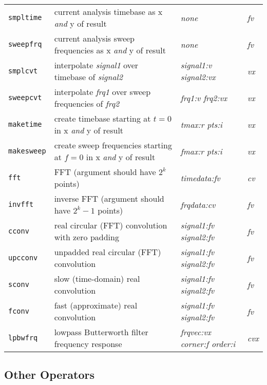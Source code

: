 \begin{tabular}{p{.8in}p{2.5in}p{1.0in}p{.75in}}
{\tt smpltime} & current analysis timebase as x {\em and} y of
result &
  {\it none} & {\it fv} \\
{\tt sweepfrq} & current analysis sweep frequencies as x {\em and}
  y of result & {\it none} & {\it fv} \\
{\tt smplcvt} & interpolate {\em signal1} over timebase of {\em
signal2} &
  {\it signal1:v \newline signal2:vx} & {\it vx} \\
{\tt sweepcvt} & interpolate {\em frq1} over sweep frequencies of
{\em frq2} &
  {\it frq1:v \newline frq2:vx} & {\it vx} \\
{\tt maketime} & create timebase starting at $t=0$ in x {\em and}
y of result &
  {\it tmax:r \newline pts:i} & {\it vx} \\
{\tt makesweep} & create sweep frequencies starting at $f=0$ in x
  {\em and} y of result & {\it fmax:r \newline pts:i} & {\it vx} \\
{\tt fft} & FFT (argument should have $2^{k}$ points) &
  {\it timedata:fv} & {\it cv} \\
{\tt invfft} & inverse FFT (argument should have $2^{k}-1$ points)
&
  {\it frqdata:cv} & {\it fv} \\
{\tt cconv} & real circular (FFT) convolution with zero padding &
  {\it signal1:fv \newline signal2:fv} & {\it fv} \\
{\tt upcconv} & unpadded real circular (FFT) convolution &
  {\it signal1:fv \newline signal2:fv} & {\it fv} \\
{\tt sconv} & slow (time-domain) real convolution &
  {\it signal1:fv \newline signal2:fv} & {\it fv} \\
{\tt fconv} & fast (approximate) real convolution &
  {\it signal1:fv \newline signal2:fv} & {\it fv} \\
{\tt lpbwfrq} & lowpass Butterworth filter frequency response &
  {\it frqvec:vx \newline corner:f \newline order:i} & {\it cvx}
\end{tabular}

\newpage
\subsection*{Other Operators}

